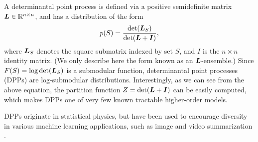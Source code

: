 \begin{example} \label{ex:dpp}
A determinantal point process \citep{lyons03,kulesza12} is defined via a positive semidefinite matrix $\bm{L} \in \mathbb{R}^{n \times n}$, and has a distribution of the form
\begin{align*}
p(S) = \frac{\det(\bm{L}_S)}{\det(\bm{L} + \bm{I})},
\end{align*}
where $\bm{L}_S$ denotes the square submatrix indexed by set $S$, and $I$ is the $n \times n$ identity matrix.
(We only describe here the form known as an $\bm{L}$-ensemble.)
Since $F(S) = \log \det(\bm{L}_S)$ is a submodular function, determinantal point processes (DPPs) are log-submodular distributions.
Interestingly, as we can see from the above equation, the partition function $Z = \det(\bm{L} + \bm{I})$ can be easily computed, which makes DPPs one of very few known tractable higher-order models.

DPPs originate in statistical physics, but have been used to encourage diversity in various machine learning applications, such as image and video summarization \citep{kulesza12,gong14}.
\end{example}

